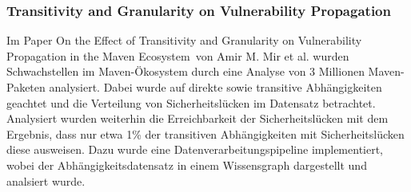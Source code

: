 \subsubsection{Transitivity and Granularity on Vulnerability Propagation} \label{sec:Transitivity}
Im Paper \glqq On the Effect of Transitivity and Granularity on Vulnerability Propagation in the Maven Ecosystem\grqq~von Amir M. Mir et al. wurden Schwachstellen im Maven-Ökosystem durch eine Analyse von 3 Millionen Maven-Paketen analysiert.
Dabei wurde auf direkte sowie transitive Abhängigkeiten geachtet und die Verteilung von Sicherheitslücken im Datensatz betrachtet.
Analysiert wurden weiterhin die Erreichbarkeit der Sicherheitslücken mit dem Ergebnis, dass nur etwa 1\% der transitiven Abhängigkeiten mit Sicherheitslücken diese ausweisen.
Dazu wurde eine Datenverarbeitungspipeline implementiert, wobei der Abhängigkeitsdatensatz in einem Wissensgraph dargestellt und analsiert wurde.